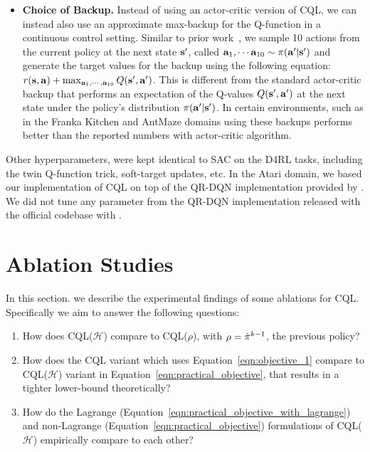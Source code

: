 \begin{itemize}
    \item \textbf{Choice of Backup.} Instead of using an actor-critic version of CQL, we can instead also use an approximate max-backup for the Q-function in a continuous control setting. Similar to prior work~\citep{kumar2019stabilizing}, we sample 10 actions from the current policy at the next state $\mathbf{s}'$, called $\mathbf{a}_1, \cdots \mathbf{a}_{10} \sim \pi(\mathbf{a}'|\mathbf{s}')$ and generate the target values for the backup using the following equation: $r(\mathbf{s}, \mathbf{a}) + \max_{\mathbf{a}_1, \cdots, \mathbf{a}_{10}} Q(\mathbf{s}', \mathbf{a}')$. This is different from the standard actor-critic backup that performs an expectation of the Q-values $Q(\mathbf{s}', \mathbf{a}')$ at the next state under the policy's distribution $\pi(\mathbf{a}'|\mathbf{s}')$. In certain environments, such as in the Franka Kitchen and AntMaze domains using these backups performs better than the reported numbers with actor-critic algorithm.
\end{itemize}

Other hyperparameters, were kept identical to SAC on the D4RL tasks, including the twin Q-function trick, soft-target updates, etc.
In the Atari domain, we based our implementation of CQL on top of the QR-DQN implementation provided by \citet{agarwal2019optimistic}. We did not tune any parameter from the QR-DQN implementation released with the official codebase with \citep{agarwal2019optimistic}.

\section{Ablation Studies}
\label{app:additional_results}
In this section. we describe the experimental findings of some ablations for CQL. Specifically we aim to answer the following questions: 
\begin{enumerate}
    \item How does CQL($\mathcal{H}$) compare to CQL($\rho$), with $\rho = \hat{\pi}^{k-1}$, the previous policy?
    \item How does the CQL variant which uses Equation~\ref{eqn:objective_1} compare to CQL($\mathcal{H}$) variant in Equation~\ref{eqn:practical_objective}, that results in a tighter lower-bound theoretically?
    \item How do the Lagrange (Equation~\ref{eqn:practical_objective_with_lagrange}) and non-Lagrange (Equation~\ref{eqn:practical_objective}) formulations of CQL($\mathcal{H}$) empirically compare to each other?
\end{enumerate}

